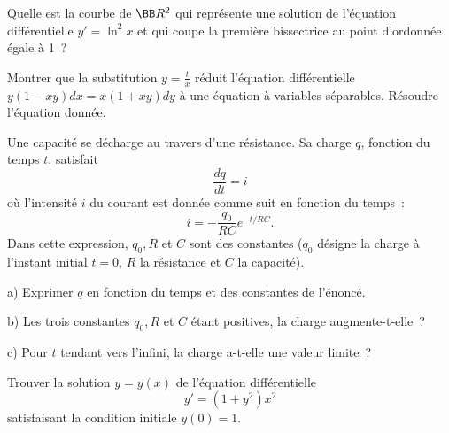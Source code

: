 \documentclass[12pt,french,oneside,a4paper]{memoir} %
\begin{document}
\begin{exo}
Quelle est la courbe de $\BB R^2$ qui représente une
solution de l'équation différentielle $y'=\ln^2x$ et qui coupe
la première bissectrice au point d'ordonnée égale à 1~?
\end{exo}
\begin{exo}
Montrer que la substitution $\displaystyle{y=\frac{t}{x}}$
réduit l'équation différentielle $y(1-xy)dx=x(1+xy)dy$ à
une équation à variables séparables. Résoudre l'équation
donnée.
\end{exo}
\begin{exo}
Une capacité se décharge au travers d'une résistance. Sa
charge $q$, fonction du temps $t$, satisfait
\begin{equation*}
\frac{dq}{dt}=i
\end{equation*}
où l'intensité $i$ du courant est donnée comme suit en
fonction du temps~:
\begin{equation*}
i=\displaystyle{-\frac{q_0}{RC}e^{-t/RC}.}
\end{equation*}
Dans cette expression, $q_0, R$ et $C$ sont des constantes ($q_0$
désigne la charge à l'instant initial $t=0$, $R$ la
résistance et $C$ la capacité).

a) Exprimer $q$ en fonction du temps et des constantes de
l'énoncé.

b) Les trois constantes $q_0, R$ et $C$ étant positives, la
charge augmente-t-elle~?

c) Pour $t$ tendant vers l'infini, la charge a-t-elle une valeur
limite~?
\end{exo}

\begin{exo}
Trouver la solution $y=y(x)$ de l'équation différentielle
\begin{equation*}
y'=(1+y^2)x^2
\end{equation*}
satisfaisant la condition initiale $y(0)=1$.
\end{exo}
\end{document}
